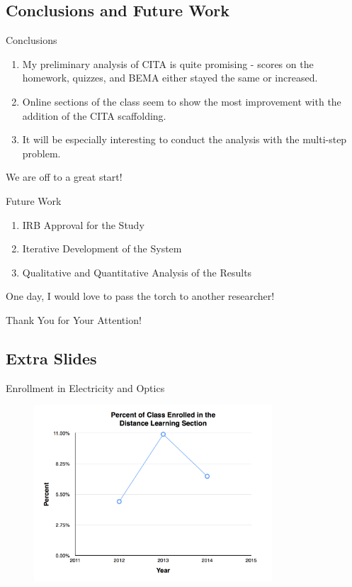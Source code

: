 \documentclass{beamer}
\begin{document}
\subsection*{Conclusions and Future Work}

\begin{frame}{Conclusions}
  \begin{enumerate}
    \item My preliminary analysis of CITA is quite promising - scores on the homework, quizzes, and BEMA either stayed the same or increased.
    \item Online sections of the class seem to show the most improvement with the addition of the CITA scaffolding.
    \item It will be especially interesting to conduct the analysis with the multi-step problem.
  \end{enumerate}
  \begin{center}
  We are off to a great start!
  \end{center}
\end{frame}

\begin{frame}{Future Work}
  \begin{enumerate}
    \item IRB Approval for the Study
    \item Iterative Development of the System
    \item Qualitative and Quantitative Analysis of the Results
  \end{enumerate}
  \begin{center}
  One day, I would love to pass the torch to another researcher!
  \end{center}
\end{frame}

\begin{frame}{}
  \begin{center}
  Thank You for Your Attention!
  \end{center}
\end{frame}

\subsection*{Extra Slides}

\begin{frame}{Enrollment in Electricity and Optics}
  \begin{figure}
    \includegraphics[width=3.5in]{img/chapter1/percent}
  \end{figure}
\end{frame}
\end{document}
